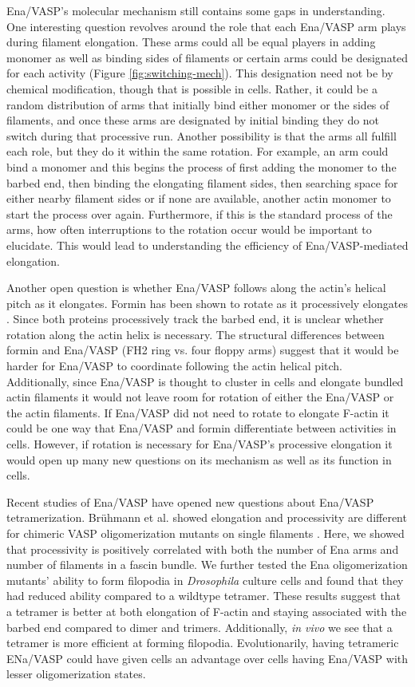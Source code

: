 Ena/VASP's molecular mechanism still contains some gaps in understanding. One interesting question revolves around the role that each Ena/VASP arm plays during filament elongation. These arms could all be equal players in adding monomer as well as binding sides of filaments or certain arms could be designated for each activity (Figure \ref{fig:switching-mech}). This designation need not be by chemical modification, though that is possible in cells. Rather, it could be a random distribution of arms that initially bind either monomer or the sides of filaments, and once these arms are designated by initial binding they do not switch during that processive run. Another possibility is that the arms all fulfill each role, but they do it within the same rotation. For example, an arm could bind a monomer and this begins the process of first adding the monomer to the barbed end, then binding the elongating filament sides, then searching space for either nearby filament sides or if none are available, another actin monomer to start the process over again. Furthermore, if this is the standard process of the arms, how often interruptions to the rotation occur would be important to elucidate. This would lead to understanding the efficiency of Ena/VASP-mediated elongation.  

Another open question is whether Ena/VASP follows along the actin's helical pitch as it elongates. Formin has been shown to rotate as it processively elongates \citep{mizuno_rotational_2011}. Since both proteins processively track the barbed end, it is unclear whether rotation along the actin helix is necessary. The structural differences between formin and Ena/VASP (FH2 ring vs. four floppy arms) suggest that it would be harder for Ena/VASP to coordinate following the actin helical pitch. Additionally, since Ena/VASP is thought to cluster in cells and elongate bundled actin filaments it would not leave room for rotation of either the Ena/VASP or the actin filaments. If Ena/VASP did not need to rotate to elongate F-actin it could be one way that Ena/VASP and formin differentiate between activities in cells. However, if rotation is necessary for Ena/VASP's processive elongation it would open up many new questions on its mechanism as well as its function in cells. 

Recent studies of Ena/VASP have opened new questions about Ena/VASP tetramerization. Br\"{u}hmann et al. showed elongation and processivity are different for chimeric VASP oligomerization mutants on single filaments \citep{bruhmann_distinct_2017}. Here, we showed that processivity is positively correlated with both the number of Ena arms and number of filaments in a fascin bundle. We further tested the Ena oligomerization mutants' ability to form filopodia in \textit{Drosophila} culture cells and found that they had reduced ability compared to a wildtype tetramer. These results suggest that a tetramer is better at both elongation of F-actin and staying associated with the barbed end compared to dimer and trimers. Additionally, \textit{in vivo} we see that a tetramer is more efficient at forming filopodia. Evolutionarily, having tetrameric ENa/VASP could have given cells an advantage over cells having Ena/VASP with lesser oligomerization states. 

